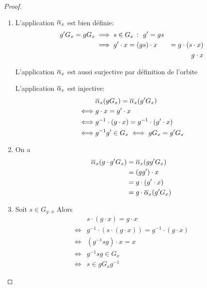 \begin{proof}\,
    \begin{enumerate}[label=(\roman*)] %
        \item L'application \({\overline{\alpha}}_x\) est bien définie:
        \begin{equation*}
            \begin{aligned}
                g'G_x = gG_x &\implies s\in G_x\ \colon\  g' = gs\\
                &\implies g'\cdot x = (gs)\cdot x &= g\cdot(s\cdot x)\\
                & & g\cdot x
            \end{aligned}
        \end{equation*}

        L'application \({\overline{\alpha}}_x\) est aussi surjective par
        définition de l'orbite

        L'application \({\overline{\alpha}}_x\) est injective:
        \begin{equation*}
            \begin{aligned}
                &{\overline{\alpha}}_x (gG_x) = {\overline{\alpha}}_x (g'G_x)\\
                \iff & g\cdot x = g'\cdot x\\
                \iff & g^{-1}\cdot(g\cdot x) = g^{-1} \cdot (g' \cdot x)\\
                \iff & g^{-1} g' \in G_x \iff gG_x = g'G_x
            \end{aligned}
        \end{equation*}

        \item On a
        \begin{equation*}
            \begin{aligned}
                {\overline{\alpha}}_x(g\cdot g'G_x) &= {\overline{\alpha}}_x (gg' G_x)\\
                &= (gg')\cdot x\\
                &= g\cdot (g'\cdot x)\\
                &= g\cdot {\overline{\alpha}}_x (g' G_x)
            \end{aligned}
        \end{equation*}

        \item Soit \(s\in G_{g\cdot x}\) Alors
        \begin{equation*}
            \begin{aligned}
                &s\cdot(g\cdot x) = g\cdot x\\
                \iff & g^{-1}\cdot(s\cdot(g\cdot x)) = g^{-1}\cdot (g\cdot x)\\
                \iff & (g^{-1}sg)\cdot x = x\\
                \iff & g^{-1}sg\in G_x\\
                \iff & s\in gG_x g^{-1}
            \end{aligned}
        \end{equation*}
    \end{enumerate}
\end{proof}

